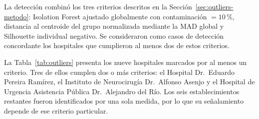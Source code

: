 La detección combinó los tres criterios descritos en la Sección~\ref{sec:outliers-metodo}: Isolation Forest ajustado globalmente con contaminación $=10\,\%$, distancia al centroide del grupo normalizada mediante la MAD global y Silhouette individual negativo. Se consideraron como casos de detección concordante los hospitales que cumplieron al menos dos de estos criterios.

La Tabla~\ref{tab:outliers} presenta los nueve hospitales marcados por al menos un criterio. Tres de ellos cumplen dos o más criterios: el Hospital Dr.\ Eduardo Pereira Ramírez, el Instituto de Neurocirugía Dr.\ Alfonso Asenjo y el Hospital de Urgencia Asistencia Pública Dr.\ Alejandro del Río. Los seis establecimientos restantes fueron identificados por una sola medida, por lo que su señalamiento depende de ese criterio particular.

